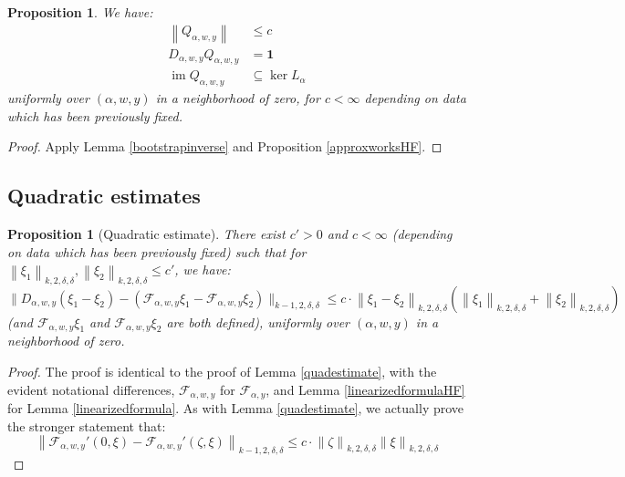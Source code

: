 \documentclass[12pt]{article}
\newtheorem{proposition}[theorem]{Proposition}
\theoremstyle{definition}
\theoremstyle{remark}
\numberwithin{equation}{subsection}
\newcommand{\F}{\mathcal F}
\newcommand{\im}{\operatorname{im}}
\begin{document}
\begin{proposition}\label{QestimatesHF}
We have:
\begin{align}
\left\|Q_{\alpha,w,y}\right\|&\leq c\\
D_{\alpha,w,y}Q_{\alpha,w,y}&=\mathbf 1\\
\im Q_{\alpha,w,y}&\subseteq\ker L_\alpha
\end{align}
uniformly over $(\alpha,w,y)$ in a neighborhood of zero, for $c<\infty$ depending on data which has been previously fixed.
\end{proposition}

\begin{proof}
Apply Lemma \ref{bootstrapinverse} and Proposition \ref{approxworksHF}.
\end{proof}

\subsection{Quadratic estimates}

\begin{proposition}[Quadratic estimate]\label{quadestimateHF}
There exist $c'>0$ and $c<\infty$ (depending on data which has been previously fixed) such that for $\left\|\xi_1\right\|_{k,2,\delta,\delta},\left\|\xi_2\right\|_{k,2,\delta,\delta}\leq c'$, we have:
\begin{equation}\label{quadestgoalHF}
\bigl\|D_{\alpha,w,y}(\xi_1-\xi_2)-(\F_{\alpha,w,y}\xi_1-\F_{\alpha,w,y}\xi_2)\bigr\|_{k-1,2,\delta,\delta}\leq c\cdot\left\|\xi_1-\xi_2\right\|_{k,2,\delta,\delta}(\left\|\xi_1\right\|_{k,2,\delta,\delta}+\left\|\xi_2\right\|_{k,2,\delta,\delta})
\end{equation}
(and $\F_{\alpha,w,y}\xi_1$ and $\F_{\alpha,w,y}\xi_2$ are both defined), uniformly over $(\alpha,w,y)$ in a neighborhood of zero.
\end{proposition}

\begin{proof}
The proof is identical to the proof of Lemma \ref{quadestimate}, with the evident notational differences, $\F_{\alpha,w,y}$ for $\F_{\alpha,y}$, and Lemma \ref{linearizedformulaHF} for Lemma \ref{linearizedformula}.  As with Lemma \ref{quadestimate}, we actually prove the stronger statement that:
\begin{equation}\label{derivislipHF}
\left\|\F_{\alpha,w,y}'(0,\xi)-\F_{\alpha,w,y}'(\zeta,\xi)\right\|_{k-1,2,\delta,\delta}\leq c\cdot\left\|\zeta\right\|_{k,2,\delta,\delta}\left\|\xi\right\|_{k,2,\delta,\delta}
\end{equation}
\end{proof}
\end{document}

